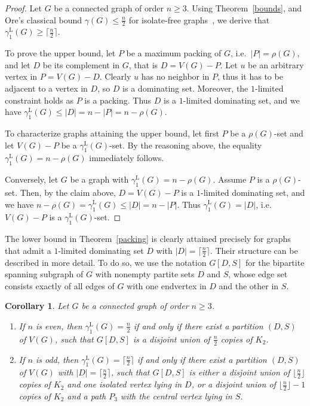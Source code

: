 \documentclass[11pt]{article}
\newtheorem{corollary}[theorem]{Corollary}
\newcommand{\gammaenaL}{\gamma_1^{\mathrm L}}
\begin{document}
\begin{proof}
Let $G$ be a connected graph of order $n\geq 3$.
Using Theorem~\ref{bounds}, and Ore's classical bound $\gamma(G)\le \frac n2$ for isolate-free graphs~\cite{ore}, we derive that $\gammaenaL(G)\geq  \lceil \frac{n}{2} \rceil$. 

To prove the upper bound, let $P$ be a maximum packing of $G$, i.e.~$|P|=\rho(G)$, and let $D$ be its complement in $G$, that is $D=V(G)-P$. Let $u$ be an arbitrary vertex in $P=V(G)-D$. Clearly $u$ has no neighbor in $P$, thus it has to be adjacent to a vertex in $D$, so $D$ is a dominating set. Moreover, the 
$1$-limited constraint holds as $P$ is a packing.
Thus $D$ is a  $1$-limited dominating set, and we have
$\gammaenaL(G)\leq |D|=n-|P|= n-\rho(G)$.

To characterize graphs attaining the upper bound,  
let first $P$ be a $\rho(G)$-set and let $V(G)-P$ be a $\gammaenaL(G)$-set. By the reasoning above, the equality $\gammaenaL(G)=n-\rho(G)$ immediately follows.

Conversely, let $G$ be a graph with $\gammaenaL(G)=n-\rho(G)$.
Assume $P$ is a $\rho(G)$-set. Then, by the claim above, $D=V(G)-P$ is a $1$-limited dominating set, and we have 
$n-\rho(G)=\gammaenaL(G)\leq |D|=n-|P|$. Thus $\gammaenaL(G)=|D|$, i.e.~$V(G)-P$ is a $\gammaenaL(G)$-set.
\end{proof} 

The lower bound in Theorem~\ref{packing} is clearly attained precisely for graphs that admit a $1$-limited dominating set $D$ with $|D|=\lceil \frac{n}{2} \rceil$.
Their structure can be described in more detail. To do so, we use the notation $G[D,S]$ for 
the bipartite spanning subgraph of $G$ with nonempty partite sets $D$ and $S$, 
whose edge set 
consists exactly of all edges of $G$ with one endvertex in $D$ and the other in $S$.

\begin{corollary}\label{cor-1}
Let $G$ be a connected graph of order $n\ge 3$. 
\begin{enumerate}
\item[(i)] If $n$ is even, then $\gammaenaL(G)=\frac n2$ if and only if there exist a partition $(D,S)$ of $V(G)$, such that $G[D,S]$ is a disjoint union of $\frac n2$ copies of $K_2$.
\item[(ii)] If $n$ is odd, then $\gammaenaL(G)=\lceil \frac{n}{2} \rceil$ if and only if there exist a partition $(D,S)$ of $V(G)$ with $|D|=\lceil \frac{n}{2} \rceil$, such that  $G[D,S]$ is either a disjoint union of $\lfloor \frac{n}{2} \rfloor$ copies of $K_2$ and one isolated vertex lying in $D$, or a disjoint union of $\lfloor \frac{n}{2} \rfloor -1$ copies of $K_2$ and a path $P_3$ with the central vertex lying in $S$.
\end{enumerate}
\end{corollary}
\end{document}
